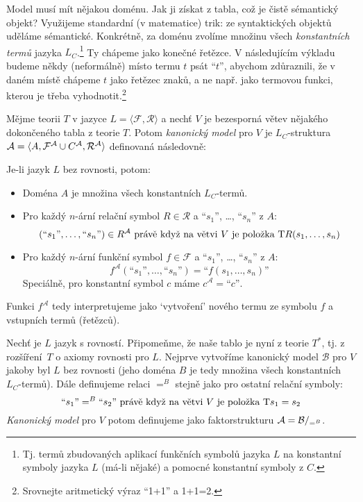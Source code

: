 Model musí mít nějakou doménu. Jak ji získat z tabla, což je čistě sémantický objekt? Využijeme standardní (v matematice) trik: ze syntaktických objektů uděláme sémantické. Konkrétně, za doménu zvolíme množinu všech \emph{konstantních termů} jazyka $L_C$.\footnote{Tj. termů zbudovaných aplikací funkčních symbolů jazyka $L$ na konstantní symboly jazyka $L$ (má-li nějaké) a pomocné konstantní symboly z $C$.} Ty chápeme jako konečné řetězce. V následujícím výkladu budeme někdy (neformálně) místo termu $t$ psát ``$t$'', abychom zdůraznili, že v daném místě chápeme $t$ jako řetězec znaků, a ne např. jako termovou funkci, kterou je třeba vyhodnotit.\footnote{Srovnejte aritmetický výraz ``1+1'' a 1+1=2.}

\begin{definition}\label{definition:canonical-model-predicate}
Mějme teorii $T$ v jazyce $L=\langle\mathcal F,\mathcal R\rangle$ a nechť $V$ je bezesporná větev nějakého dokončeného tabla z teorie $T$. Potom \emph{kanonický model} pro $V$ je $L_C$-struktura $\mathcal{A}=\langle A,\mathcal F^\mathcal A\cup C^\mathcal A,\mathcal R^\mathcal A\rangle$ definovaná následovně:

Je-li jazyk $L$ bez rovnosti, potom:
\begin{itemize}
    \item Doména $A$ je množina všech konstantních $L_C$-termů.
    \item Pro každý $n$-ární relační symbol $R\in\mathcal R$ a ``$s_1$'', \dots, ``$s_n$'' z $A$:
    $$
    (\text{``$s_1$''},\dots,\text{``$s_n$''})\in R^\mathcal A\text{ právě když na větvi $V$ je položka $\mathrm{T} R(s_1,\dots,s_n)$}
    $$
    \item Pro každý $n$-ární funkční symbol $f\in\mathcal F$ a ``$s_1$'', \dots, ``$s_n$'' z $A$:
    $$
    f^\mathcal A(\text{``$s_1$''},\dots,\text{``$s_n$''})=\text{``$f(s_1,\dots,s_n)$''}
    $$
    Speciálně, pro konstantní symbol $c$ máme $c^\mathcal A=\text{``$c$''}$.
\end{itemize}
Funkci $f^\mathcal A$ tedy interpretujeme jako `vytvoření' nového termu ze symbolu $f$ a vstupních termů (řetězců). 

Nechť je $L$ jazyk s rovností. Připomeňme, že naše tablo je nyní z teorie $T^*$, tj. z rozšíření~$T$ o axiomy rovnosti pro $L$. Nejprve vytvoříme kanonický model $\mathcal B$ pro $V$ jakoby byl $L$ bez rovnosti (jeho doména $B$ je tedy množina všech konstantních $L_C$-termů). Dále definujeme relaci $=^B$ stejně jako pro ostatní relační symboly:
$$
\text{``$s_1$''}=^B\text{``$s_2$''}\text{ právě když na větvi $V$ je položka $\mathrm{T} s_1=s_2$}
$$
\emph{Kanonický model} pro $V$ potom definujeme jako faktorstrukturu $\mathcal{A}=\mathcal{B}/_{=^B}$.
\end{definition}

